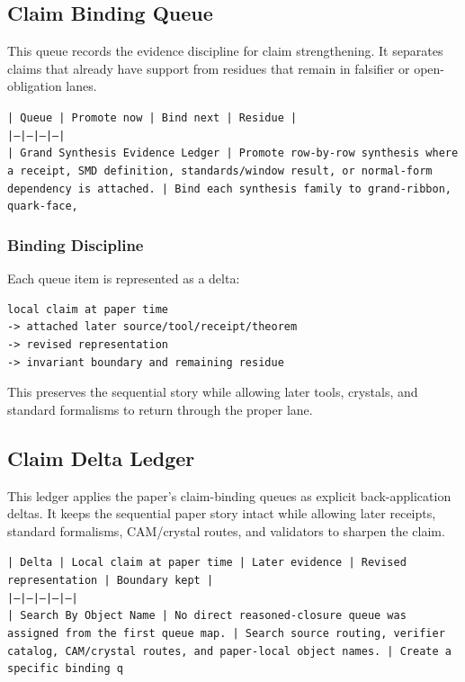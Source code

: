 \documentclass[11pt]{article}
\begin{document}
\subsection*{Claim Binding Queue}

This queue records the evidence discipline for claim strengthening. It separates claims that already have support from residues that remain in falsifier or open-obligation lanes.

\noindent\texttt{| Queue | Promote now | Bind next | Residue |}\\
\noindent\texttt{|---|---|---|---|}\\
\noindent\texttt{| Grand Synthesis Evidence Ledger | Promote row-by-row synthesis where a receipt, SMD definition, standards/window result, or normal-form dependency is attached. | Bind each synthesis family to grand-ribbon, quark-face, }\\

\subsubsection*{Binding Discipline}

Each queue item is represented as a delta:

\begin{verbatim}
local claim at paper time
-> attached later source/tool/receipt/theorem
-> revised representation
-> invariant boundary and remaining residue
\end{verbatim}

This preserves the sequential story while allowing later tools, crystals, and
standard formalisms to return through the proper lane.

\subsection*{Claim Delta Ledger}

This ledger applies the paper's claim-binding queues as explicit back-application
deltas. It keeps the sequential paper story intact while allowing later
receipts, standard formalisms, CAM/crystal routes, and validators to sharpen the
claim.

\noindent\texttt{| Delta | Local claim at paper time | Later evidence | Revised representation | Boundary kept |}\\
\noindent\texttt{|---|---|---|---|---|}\\
\noindent\texttt{| Search By Object Name | No direct reasoned-closure queue was assigned from the first queue map. | Search source routing, verifier catalog, CAM/crystal routes, and paper-local object names. | Create a specific binding q}\\
\end{document}
